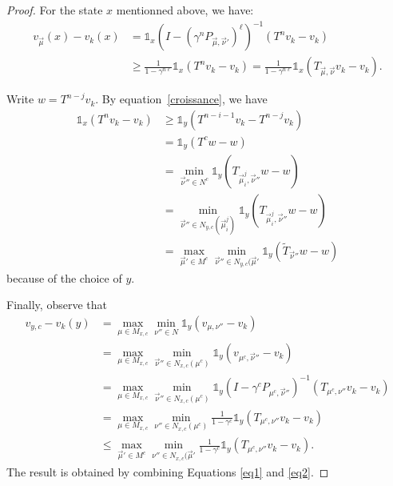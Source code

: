 \documentclass{article}
\def\1{{\mathds 1}}
\begin{document}
\begin{proof}
For the state $x$ mentionned above, we have:
\begin{align}
  v_{\vec\mu}(x) - v_k(x) & = \1_x (I-(\gamma^n P_{\vec\mu,\vec\nu'})^\ell)^{-1} (T^n v_k - v_k) \\
  & \ge \frac{1}{1-\gamma^{n\ell}} \1_x (T^n v_k - v_k)  = \frac{1}{1-\gamma^{n\ell}} \1_x (T_{\vec\mu,\vec\nu} v_k - v_k).
\end{align}


Write $w=T^{n-j}v_k$. By equation~\eqref{croissance}, we have
\begin{align}
  \1_x (T^n v_k - v_k) & \ge \1_y (T^{n-i-1} v_k  - T^{n-j} v_k) \\
  & = \1_y (T^c w  - w) \\
  & = \min_{\vec\nu'' \in N^c} \1_y (T_{\vec\mu_i^j,\vec\nu''}w-w) \\
  & = \min_{\vec\nu'' \in N_{y,c}(\vec\mu_i^j)} \1_y (T_{\vec\mu_i^j,\vec\nu''}w-w) \\
  & = \max_{\vec\mu' \in M^c} \min_{\vec\nu'' \in N_{y,c}(\vec\mu'} \1_y (\tilde T_{\vec\nu''}w-w)\label{eq1}
\end{align}
because of the choice of $y$.

Finally, observe that
\begin{align}
  v_{y,c} - v_k(y) & = \max_{\mu \in M_{x,c}} \min_{\nu'' \in N}  \1_y (v_{\mu,\nu''} - v_k) \\
  & = \max_{\mu \in M_{x,c}} \min_{\vec\nu'' \in N_{x,c}(\mu^c)}  \1_y (v_{\mu^c,\vec\nu''} - v_k) \\
  & = \max_{\mu \in M_{x,c}} \min_{\vec\nu'' \in N_{x,c}(\mu^c)}  \1_y (I-\gamma^c P_{\mu^c,\vec\nu''})^{-1} (T_{\mu^c,\nu''} v_k - v_k ) \\
  & = \max_{\mu \in M_{x,c}} \min_{\nu'' \in N_{x,c}(\mu^c)} \frac{1}{1-\gamma^c} \1_y(T_{\mu^c,\nu''} v_k - v_k ) \\
  & \le \max_{\vec\mu' \in M^c} \min_{\nu'' \in N_{x,c}(\vec\mu'} \frac{1}{1-\gamma^c} \1_y(T_{\mu^c,\nu''} v_k - v_k ).
  \label{eq2}
\end{align}
The result is obtained by combining Equations \eqref{eq1} and \eqref{eq2}.

\end{proof}



 
\end{document}
